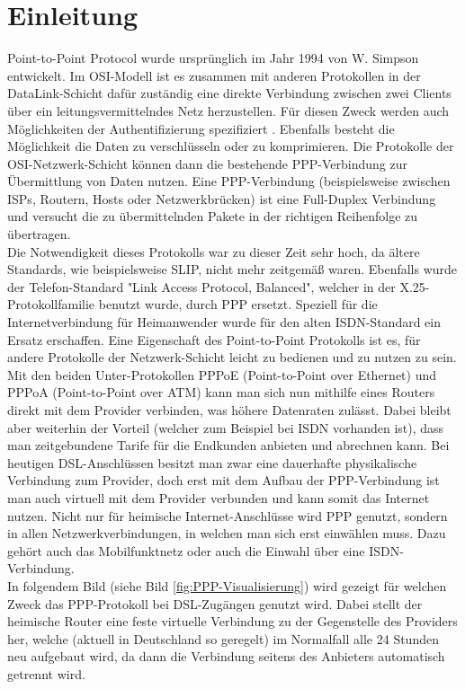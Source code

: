 \documentclass[journal,11pt]{IEEEtran}
\begin{document}
\section{Einleitung} 
 Point-to-Point Protocol wurde urspr\"unglich im Jahr 1994 von W. Simpson entwickelt. Im OSI-Modell ist es zusammen mit anderen Protokollen in der DataLink-Schicht daf\"ur zust\"andig eine direkte Verbindung zwischen zwei Clients \"uber ein leitungsvermittelndes Netz herzustellen. F\"ur diesen Zweck werden auch M\"oglichkeiten der Authentifizierung spezifiziert \cite{RFC1661}. Ebenfalls besteht die M\"oglichkeit die Daten zu verschl\"usseln oder zu komprimieren. Die Protokolle der OSI-Netzwerk-Schicht k\"onnen dann die bestehende PPP-Verbindung zur \"Ubermittlung von Daten nutzen. Eine PPP-Verbindung (beispielsweise zwischen ISPs, Routern, Hosts oder Netzwerkbr\"ucken) ist eine Full-Duplex Verbindung und versucht die zu \"ubermittelnden Pakete in der richtigen Reihenfolge zu \"ubertragen.\\
Die Notwendigkeit dieses Protokolls war zu dieser Zeit sehr hoch, da \"altere Standards, wie beispielsweise SLIP, nicht mehr zeitgem\"a\ss{} waren. Ebenfalls wurde der Telefon-Standard "Link Access Protocol, Balanced", welcher in der X.25-Protokollfamilie benutzt wurde, durch PPP ersetzt.  Speziell f\"ur die Internetverbindung f\"ur Heimanwender wurde f\"ur den alten ISDN-Standard ein Ersatz erschaffen. Eine Eigenschaft des Point-to-Point Protokolls ist es, f\"ur andere Protokolle der Netzwerk-Schicht leicht zu bedienen und zu nutzen zu sein. Mit den beiden Unter-Protokollen PPPoE (Point-to-Point over Ethernet)\cite{RFC2516} und PPPoA (Point-to-Point over ATM)\cite{RFC2364} kann man sich nun mithilfe eines Routers direkt mit dem Provider verbinden, was h\"ohere Datenraten zul\"asst. Dabei bleibt aber weiterhin der Vorteil (welcher zum Beispiel bei ISDN vorhanden ist), dass man zeitgebundene Tarife f\"ur die Endkunden anbieten und abrechnen kann. Bei heutigen DSL-Anschl\"ussen besitzt man zwar eine dauerhafte physikalische Verbindung zum Provider, doch erst mit dem Aufbau der PPP-Verbindung ist man auch virtuell mit dem Provider verbunden und kann somit das Internet nutzen. Nicht nur f\"ur heimische Internet-Anschl\"usse wird PPP genutzt, sondern in allen Netzwerkverbindungen, in welchen man sich erst einw\"ahlen muss. Dazu geh\"ort auch das Mobilfunktnetz oder auch die Einwahl \"uber eine ISDN-Verbindung.\\
In folgendem Bild (siehe Bild \ref{fig:PPP-Visualisierung}) wird gezeigt f\"ur welchen Zweck das PPP-Protokoll bei DSL-Zug\"angen genutzt wird. Dabei stellt der heimische Router eine feste virtuelle Verbindung zu der Gegenstelle des Providers her, welche (aktuell in Deutschland so geregelt) im Normalfall alle 24 Stunden neu aufgebaut wird, da dann die Verbindung seitens des Anbieters automatisch getrennt wird. \\
\end{document}
